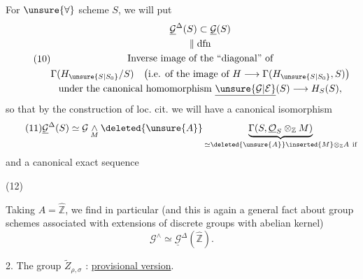 For $\unsure{\forall}$ scheme $S$, we will put
\[
\tag{10}
\begin{gathered}
\underline{\mathcal G}^{\Delta}(S)\subset\underline{\mathcal G}(S)\\
\Vert\;\mathrm{dfn}\\
\text{Inverse image of the ``diagonal'' of}\\
\Gamma(H_{\unsure{S|S_0}}/S)
\quad\bigl(\text{i.e. of the image of }H\longrightarrow\Gamma(H_{\unsure{S|S_0}},S)\bigr)\\
\text{under the canonical homomorphism }\underline{\unsure{\mathcal G|\mathcal E}}(S)\longrightarrow H_S(S),
\end{gathered}
\]
so that by the construction of loc. cit. we will have a canonical isomorphism
\[
\tag{11}
\underline{\mathcal G}^{\Delta}(S)\simeq
\mathcal G\underset{M}{\wedge}\deleted{\unsure{A}}
\underbrace{\Gamma(S,\underline{\mathcal O}_S\otimes_{\mathbb Z}M)}_{
\simeq\deleted{\unsure{A}}\inserted{M}\otimes_{\mathbb Z}A\ \text{if}}
\]
and a canonical exact sequence

(12)\quad{}


Taking $A=\widehat{\mathbb Z}$, we find in particular (and this is again a general fact about group schemes associated with extensions of discrete groups with abelian kernel)
\[
\tag{13}
\mathcal G^{\wedge}\simeq\underline{\mathcal G}^{\Delta}(\widehat{\mathbb Z}).
\]


2. The group $\widetilde Z_{\rho,\sigma}$ : \uline{provisional version}.

